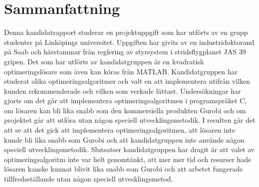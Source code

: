 \section{Sammanfattning}
Denna kandidatrapport studerar en projektuppgift som har utförts av en grupp studenter på Linköpings universitet. Uppgiften har givits av en industridoktorand på Saab och härstammar från reglering av styrsystem i stridsflygplanet JAS 39 gripen. Det som har utförts av kandidatgruppen är en  kvadratisk optimeringslösare som även kan köras från MATLAB. Kandidatgruppen har studerat olika optimeringsalgoritmer och valt en att implementera utifrån vilken kunden rekommenderade och vilken som verkade lättast. Undersökningar har gjorts om det går att implementera optimeringsalgoritmen i programspråket C, om lösaren kan bli lika snabb som den kommersiella produkten Gurobi och om projektet går att utföra utan någon speciell utvecklingsmetodik. I resulten går det att se att det gick att implementera optimeringsalgoritmen, att lösaren inte kunde bli lika snabb som Gurobi och att kandidatgruppen inte använde någon speciell utvecklingsmetodik. Slutsatser kandidatgruppen har dragit är att valet av optimeringsalgoritm inte var helt genomtänkt, att mer mer tid och resurser hade lösaren kanske kunnat blivit lika snabb som Gurobi och att arbetet fungerade tillfredsställande utan någon speciell utvecklingsmetod.     